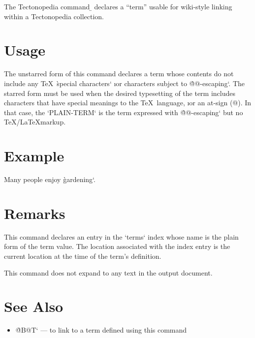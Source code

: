 
The Tectonopedia command \b{\string\DeclareTerm} declares a “term” usable for
wiki-style linking within a Tectonopedia collection.

\section*{Usage}

\begin{texdisp}
\end{texdisp}

The unstarred form of this command declares a term whose contents do not include
any \TeX\ \`special characters` \i{or} characters subject to \`@@-escaping`. The
starred form must be used when the desired typesetting of the term includes
characters that have special meanings to the \TeX\ language, \i{or} an at-sign
(@). In that case, the \tex`PLAIN-TERM` is the term expressed with
\`@@-escaping` but no \TeX/\LaTeX markup.

\section*{Example}

\begin{texdisp}

Many people enjoy \`gardening`.
\end{texdisp}

\section*{Remarks}

This command declares an entry in the \tex`terms` index whose name is the plain
form of the term value. The location associated with the index entry is the
current location at the time of the term’s definition.

This command does not expand to any text in the output document.

\section*{See Also}

\begin{itemize}
\item \`@B@T` — to link to a term defined using this command
\end{itemize}


